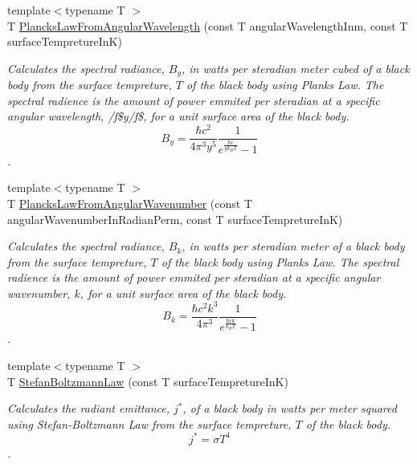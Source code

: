 \begin{DoxyCompactItemize}
{\footnotesize template$<$typename T $>$ }\\T \mbox{\hyperlink{group___e_g_x_phys-_electrodynamics-_black_body-_plancks_law_ga7322124727f968d28807e918c5eeb23f}{Plancks\+Law\+From\+Angular\+Wavelength}} (const T angular\+Wavelength\+Inm, const T surface\+Tempreture\+InK)
\begin{DoxyCompactList}\small\item\em Calculates the spectral radiance, $B_{y}$, in watts per steradian meter cubed of a black body from the surface tempreture, $T$ of the black body using Plank\textquotesingle{}s Law. The spectral radience is the amount of power emmited per steradian at a specific angular wavelength, /f\$y/f\$, for a unit surface area of the black body. \[ B_{y} = \dfrac{\hbar c^2}{4\pi^3y^5} \dfrac{1}{e^{\frac{\hbar c}{y k_B T}} - 1} \]. \end{DoxyCompactList}\item 
{\footnotesize template$<$typename T $>$ }\\T \mbox{\hyperlink{group___e_g_x_phys-_electrodynamics-_black_body-_plancks_law_gaa3d3e0fdb77d25bdd40523f9975de902}{Plancks\+Law\+From\+Angular\+Wavenumber}} (const T angular\+Wavenumber\+In\+Radian\+Perm, const T surface\+Tempreture\+InK)
\begin{DoxyCompactList}\small\item\em Calculates the spectral radiance, $B_{k}$, in watts per steradian meter of a black body from the surface tempreture, $T$ of the black body using Plank\textquotesingle{}s Law. The spectral radience is the amount of power emmited per steradian at a specific angular wavenumber, $k$, for a unit surface area of the black body. \[ B_{k} = \dfrac{\hbar c^2 k^3}{4\pi^3} \dfrac{1}{e^{\frac{\hbar c k}{k_B T}} - 1} \]. \end{DoxyCompactList}\item 
{\footnotesize template$<$typename T $>$ }\\T \mbox{\hyperlink{group___e_g_x_phys-_electrodynamics-_black_body-_stefan_boltzmann_law_gadfc1c4242b5364a747169569ae5c84ef}{Stefan\+Boltzmann\+Law}} (const T surface\+Tempreture\+InK)
\begin{DoxyCompactList}\small\item\em Calculates the radiant emittance, $j^*$, of a black body in watts per meter squared using Stefan-\/\+Boltzmann Law from the surface tempreture, $T$ of the black body. \[j^*=\sigma T^4\]. \end{DoxyCompactList}\item 

\end{DoxyCompactItemize}
